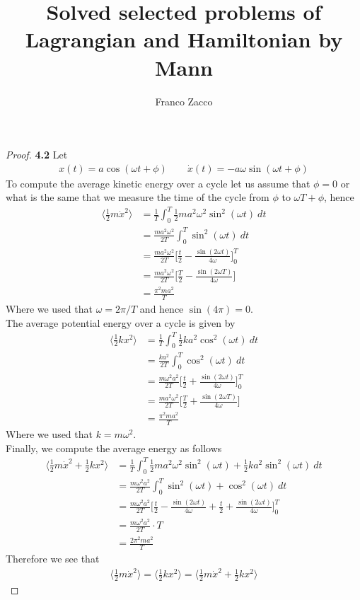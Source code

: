 \documentclass[11pt]{article}
\title{\textbf{Solved selected problems of Lagrangian and Hamiltonian by Mann}}
\author{Franco Zacco}
\date{}
\theoremstyle{definition}
\begin{document}
\maketitle
\thispagestyle{empty}

\begin{proof}{\textbf{4.2}}
Let
\begin{align*}
    x(t) = a\cos(\omega t + \phi) \qquad
    \dot{x}(t) = - a\omega \sin(\omega t + \phi)
\end{align*}
To compute the average kinetic energy over a cycle let us assume that $\phi = 0$
or what is the same that we measure the time of the cycle from $\phi$ to
$\omega T + \phi$, hence
\begin{align*}
    \langle\frac{1}{2}m\dot{x}^2\rangle
    &= \frac{1}{T}\int_{0}^T \frac{1}{2}m a^2\omega^2 \sin^2(\omega t)~dt\\
    &= \frac{ma^2\omega^2}{2T}\int_{0}^T \sin^2(\omega t)~dt\\
    &= \frac{ma^2\omega^2}{2T}\bigg[\frac{t}{2}-\frac{\sin(2\omega t)}{4\omega}\bigg]_0^T\\
    &= \frac{ma^2\omega^2}{2T}\bigg[\frac{T}{2}-\frac{\sin(2\omega T)}{4\omega}\bigg]\\
    &= \frac{\pi^2ma^2}{T}
\end{align*}
Where we used that $\omega = 2\pi/T$ and hence $\sin(4\pi) = 0$.\\
The average potential energy over a cycle is given by
\begin{align*}
    \langle\frac{1}{2}kx^2\rangle
    &= \frac{1}{T}\int_{0}^T \frac{1}{2}k a^2 \cos^2(\omega t)~dt\\
    &= \frac{ka^2}{2T}\int_{0}^T \cos^2(\omega t)~dt\\
    &= \frac{m\omega^2a^2}{2T}\bigg[\frac{t}{2} + \frac{\sin(2\omega t)}{4\omega}\bigg]_0^T\\
    &= \frac{ma^2\omega^2}{2T}\bigg[\frac{T}{2} + \frac{\sin(2\omega T)}{4\omega}\bigg]\\
    &= \frac{\pi^2ma^2}{T}
\end{align*}
Where we used that $k = m\omega^2$.\\
Finally, we compute the average energy as follows
\begin{align*}
    \langle\frac{1}{2}m\dot{x}^2 + \frac{1}{2}kx^2\rangle
    &= \frac{1}{T}\int_{0}^T \frac{1}{2}m a^2\omega^2 \sin^2(\omega t)
    + \frac{1}{2}k a^2 \sin^2(\omega t)~dt\\
    &= \frac{m\omega^2a^2}{2T}\int_{0}^T \sin^2(\omega t) + \cos^2(\omega t)~dt\\
    &= \frac{m\omega^2a^2}{2T}\bigg[
        \frac{t}{2}-\frac{\sin(2\omega t)}{4\omega}
        + \frac{t}{2} + \frac{\sin(2\omega t)}{4\omega}
    \bigg]_0^T\\
    &= \frac{m\omega^2a^2}{2T}\cdot T\\
    &= \frac{2\pi^2ma^2}{T}
\end{align*}
Therefore we see that
\begin{align*}
    \langle\frac{1}{2}m\dot{x}^2\rangle = \langle\frac{1}{2}kx^2\rangle
    = \langle\frac{1}{2}m\dot{x}^2 + \frac{1}{2}kx^2\rangle
\end{align*}
\end{proof}
\end{document}
